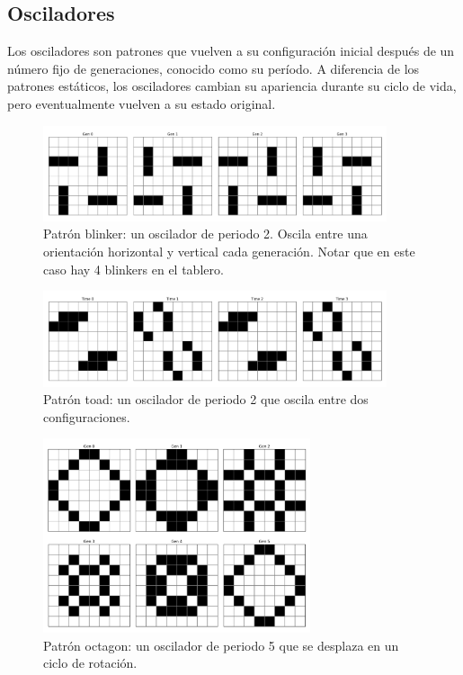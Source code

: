 \documentclass[]{article}
\begin{document}
\subsection{Osciladores}
Los osciladores son patrones que vuelven a su configuración inicial después de un número fijo de generaciones, conocido como su período. A diferencia de los patrones estáticos, los osciladores cambian su apariencia durante su ciclo de vida, pero eventualmente vuelven a su estado original.

\begin{figure}[H]
  \centering
  \includegraphics[width=0.9\textwidth]{../assets/oscillator/blinker/blinker.png}
  \caption{Patrón blinker: un oscilador de periodo 2. Oscila entre una orientación horizontal y vertical cada generación. Notar que en este caso hay 4 blinkers en el tablero.}
  \label{fig:blinker}
\end{figure}

\begin{figure}[H]
  \centering
  \includegraphics[width=0.9\textwidth]{../assets/oscillator/toad/toad.png}
  \caption{Patrón toad: un oscilador de periodo 2 que oscila entre dos configuraciones.}
  \label{fig:toad}
\end{figure}

\begin{figure}[H]
  \centering
  \includegraphics[width=0.7\textwidth]{../assets/oscillator/octagon_2/octagon_2.png}
  \caption{Patrón octagon: un oscilador de periodo 5 que se desplaza en un ciclo de rotación.}
  \label{fig:octagon}
\end{figure}
\end{document}
